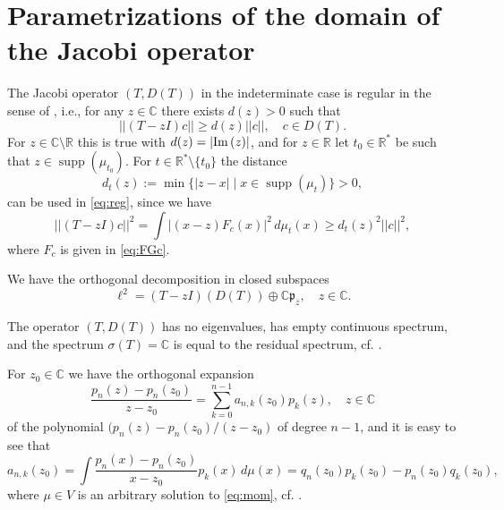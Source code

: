 \documentclass [12pt]{article}
\def\Im{{\rm Im}\,}
\DeclareMathOperator{\supp}{supp}
\newcommand{\C}{\mathbb{C}}
\newcommand{\R}{\mathbb{R}}
\begin{document}
\section{Parametrizations of the domain of the Jacobi operator}
The Jacobi operator $(T,D(T))$ in the indeterminate case is regular in the sense of \cite[p. 20]{G:G}, i.e., for any $z\in\C$ there exists $d(z)>0$ such that
\begin{equation}\label{eq:reg}
||(T-zI)c||\ge d(z)||c||,\quad c\in D(T).
\end{equation}
For $z\in\C\setminus\R$ this is true with $d(z)=|\Im(z)|$, and for $z\in\R$ let $t_0\in\R^*$ be such that $z\in\supp(\mu_{t_0})$. For $t\in\R^*\setminus\{t_0\}$ the distance 
$$
d_t(z):=\min\{|z-x|\mid x\in \supp(\mu_t)\}>0,
$$ 
can be used in \eqref{eq:reg}, since we have
$$
||(T-zI)c||^2= \int \left|(x-z)F_c(x)\right|^2\,d\mu_t(x)\ge d_t(z)^2||c||^2,
$$
where $F_c$ is given in \eqref{eq:FGc}.

We have the orthogonal decomposition in closed subspaces
\begin{equation}\label{eq:regor}
\ell^2=(T-zI)(D(T))\oplus \C\mathfrak{p}_{\overline{z}},\quad z\in\C.
\end{equation}

The operator $(T,D(T))$ has no eigenvalues, has empty continuous spectrum, and the spectrum $\sigma(T)=\C$ is equal to the residual  spectrum, cf. \cite[p.209]{Y}.
 
 For $z_0\in\C$ we have the orthogonal expansion
\begin{equation}\label{eq:1}
\frac{p_n(z)-p_n(z_0)}{z-z_0}=\sum_{k=0}^{n-1} a_{n,k}(z_0)p_k(z), \quad z\in\C
\end{equation}
of the polynomial $(p_n(z)-p_n(z_0)/(z-z_0)$ of degree $n-1$, and it is easy to see that
\begin{equation}\label{eq:2}
a_{n,k}(z_0)=\int \frac{p_n(x)-p_n(z_0)}{x-z_0}p_k(x)\,d\mu(x)=  q_n(z_0)p_k(z_0)-p_n(z_0)q_k(z_0),
\end{equation}
where $\mu\in V$ is an arbitrary solution to \eqref{eq:mom}, cf. \cite[p. 18]{Ak}.
\end{document}
